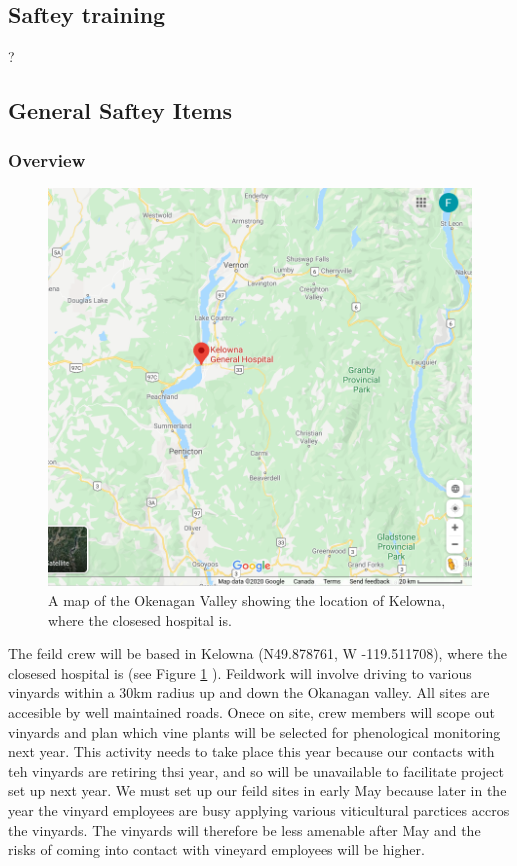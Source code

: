 \documentclass[11pt,letter]{article}
\begin{document}
\subsection{Saftey training}
?

\subsection {General Saftey Items}

\subsubsection{Overview}
\begin{figure}
  \includegraphics[width=\linewidth]{OkanaganMap.png}
  \caption{A map of the Okenagan Valley showing the location of Kelowna, where the closesed hospital is.}
  \label{fig:OkanMap}
\end{figure}
The feild crew will be based in Kelowna (N49.878761, W -119.511708), where the closesed hospital is (see Figure \ref{fig:OkanMap} ). Feildwork will involve driving to various vinyards within a 30km radius up and down the Okanagan valley. All sites are accesible by well maintained roads. Onece on site, crew members will scope out vinyards and plan which vine plants will be selected for phenological monitoring next year. This activity needs to take place this year because our contacts with teh vinyards are retiring thsi year, and so will be unavailable to facilitate project set up next year. We must set up our feild sites in early May because later in the year the vinyard employees are busy applying various viticultural parctices accros the vinyards. The vinyards will therefore be less amenable after May and the risks of coming into contact with vineyard employees will be higher.   
\end{document}

